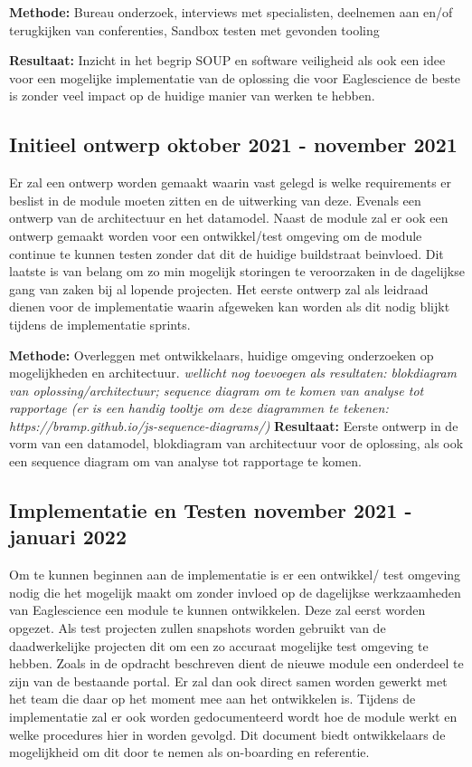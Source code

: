 \textbf{Methode:} Bureau onderzoek, interviews met specialisten, deelnemen aan en/of terugkijken van conferenties, Sandbox testen met gevonden tooling

\textbf{Resultaat:} Inzicht in het begrip SOUP en software veiligheid als ook een idee voor een mogelijke implementatie van de oplossing die voor Eaglescience de beste is zonder veel impact op de huidige manier van werken te hebben.

\subsection{Initieel ontwerp \textbf{oktober 2021 - november 2021 }}\label{subsec:initieel-ontwerp}
Er zal een ontwerp worden gemaakt waarin vast gelegd is welke requirements er beslist in de module moeten zitten en de uitwerking van deze. Evenals een ontwerp van de architectuur en het datamodel. Naast de module zal er ook een ontwerp gemaakt worden voor een ontwikkel/test omgeving om de module continue te kunnen testen zonder dat dit de huidige buildstraat beinvloed. Dit laatste is van belang om zo min mogelijk storingen te veroorzaken in de dagelijkse gang van zaken bij al lopende projecten. Het eerste ontwerp zal als leidraad dienen voor de implementatie waarin afgeweken kan worden als dit nodig blijkt tijdens de implementatie sprints.

\textbf{Methode:} Overleggen met ontwikkelaars, huidige omgeving onderzoeken op mogelijkheden en architectuur.
\textit{wellicht nog toevoegen als resultaten: blokdiagram van oplossing/architectuur; sequence diagram om te komen van analyse tot rapportage (er is een handig tooltje om deze diagrammen te tekenen: https://bramp.github.io/js-sequence-diagrams/)}
\textbf{Resultaat:} Eerste ontwerp in de vorm van een datamodel, blokdiagram van architectuur voor de oplossing, als ook een sequence diagram om van analyse tot rapportage te komen.


\subsection{Implementatie en Testen \textbf{november 2021 - januari 2022 }}\label{subsec:implementatie-en-testen}
Om te kunnen beginnen aan de implementatie is er een ontwikkel/ test omgeving nodig die het mogelijk maakt om zonder invloed op de dagelijkse werkzaamheden van Eaglescience een module te kunnen ontwikkelen. Deze zal eerst worden opgezet. Als test projecten zullen snapshots worden gebruikt van de daadwerkelijke projecten dit om een zo accuraat mogelijke test omgeving te hebben. Zoals in de opdracht beschreven dient de nieuwe module een onderdeel te zijn van de bestaande portal. Er zal dan ook direct samen worden gewerkt met het team die daar op het moment mee aan het ontwikkelen is. Tijdens de implementatie zal er ook worden gedocumenteerd wordt hoe de module werkt en welke procedures hier in worden gevolgd. Dit document biedt ontwikkelaars de mogelijkheid om dit door te nemen als on-boarding en referentie.

